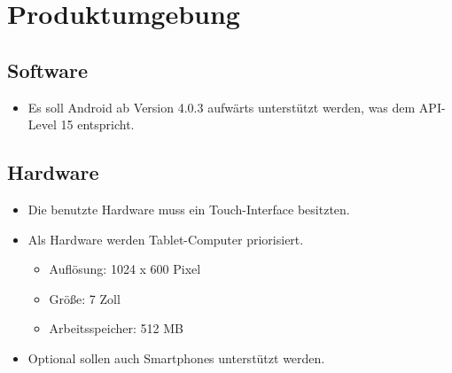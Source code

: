\section{Produktumgebung}

\subsection{Software}
\begin{itemize}
	\item Es soll Android ab Version 4.0.3 aufwärts unterstützt werden, was dem API-Level 15 entspricht.
\end{itemize}
\subsection{Hardware}
\begin{itemize}
	\item Die benutzte Hardware muss ein Touch-Interface besitzten.
	\item Als Hardware werden Tablet-Computer priorisiert.
	\begin{itemize}
		\item Auflösung: 1024 x 600 Pixel
		\item Größe: 7 Zoll
		\item Arbeitsspeicher: 512 MB
	\end{itemize}
	\item Optional sollen auch Smartphones unterstützt werden.
\end{itemize}
